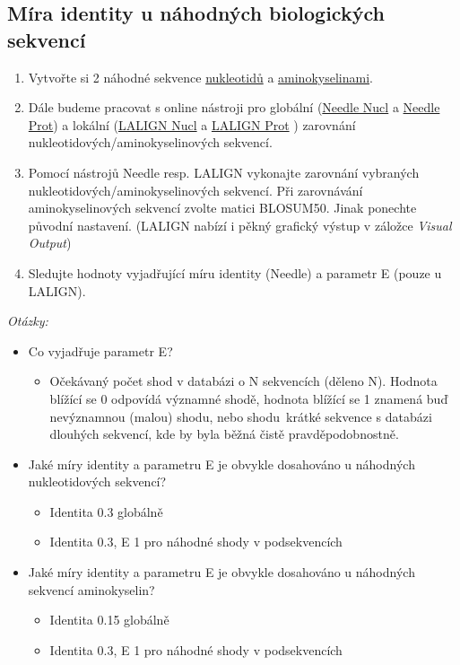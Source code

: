 \documentclass[11pt]{article}
\begin{document}
\subsection{Míra identity u náhodných biologických sekvencí}
\label{sec:orgc6dfdd0}
\begin{enumerate}
\item Vytvořte si 2 náhodné sekvence \href{http://www.bioinformatics.org/sms2/random\_dna.html}{nukleotidů} a \href{http://www.bioinformatics.org/sms2/random\_protein.html}{aminokyselinami}.
\item Dále budeme pracovat s online nástroji pro globální (\href{https://www.ebi.ac.uk/Tools/psa/emboss\_needle/nucleotide.html}{Needle Nucl} a \href{https://www.ebi.ac.uk/Tools/psa/emboss\_needle/}{Needle
Prot}) a lokální (\href{https://www.ebi.ac.uk/Tools/psa/lalign/nucleotide.html}{LALIGN Nucl} a \href{https://www.ebi.ac.uk/Tools/psa/lalign/}{LALIGN Prot} ) zarovnání
nukleotidových/aminokyselinových sekvencí.
\item Pomocí nástrojů Needle resp. LALIGN vykonajte zarovnání vybraných
nukleotidových/aminokyselinových sekvencí. Při zarovnávání aminokyselinových
sekvencí zvolte matici BLOSUM50. Jinak ponechte původní nastavení. (LALIGN
nabízí i pěkný grafický výstup v záložce \emph{Visual Output})
\item Sledujte hodnoty vyjadřující míru identity (Needle) a parametr E (pouze u
LALIGN).
\end{enumerate}

\emph{Otázky:}
\begin{itemize}
\item Co vyjadřuje parametr E?
\begin{itemize}
\item Očekávaný počet shod v databázi o N sekvencích (děleno N). Hodnota blížící
se 0 odpovídá významné shodě, hodnota blížící se 1 znamená buď nevýznamnou
(malou) shodu, nebo shodu krátké sekvence s databázi dlouhých sekvencí, kde
by byla běžná čistě pravděpodobnostně.
\end{itemize}
\item Jaké míry identity a parametru E je obvykle dosahováno u náhodných
nukleotidových sekvencí?
\begin{itemize}
\item Identita 0.3 globálně
\item Identita 0.3, E 1 pro náhodné shody v podsekvencích
\end{itemize}
\item Jaké míry identity a parametru E je obvykle dosahováno u náhodných
sekvencí aminokyselin?
\begin{itemize}
\item Identita 0.15 globálně
\item Identita 0.3, E 1 pro náhodné shody v podsekvencích
\end{itemize}
\end{itemize}
\end{document}
